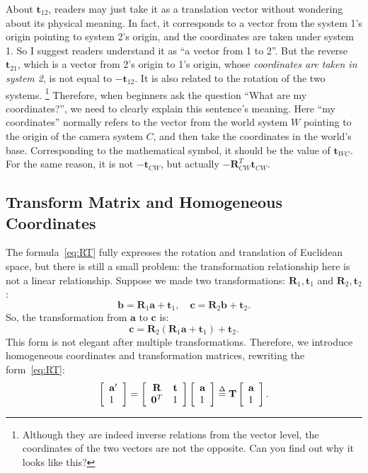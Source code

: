 About $\mathbf{t}_{12}$, readers may just take it as a translation vector without wondering about its physical meaning. In fact, it corresponds to a vector from the system 1's origin pointing to system 2's origin, and the coordinates are taken under system 1. So I suggest readers understand it as ``a vector from 1 to 2''. But the reverse $ \mathbf{t}_{21} $, which is a vector from 2's origin to 1's origin, whose \textit{coordinates are taken in system 2}, is not equal to $-\mathbf{t}_{12}$. It is also related to the rotation of the two systems. \footnote{Although they are indeed inverse relations from the vector level, the coordinates of the two vectors are not the opposite. Can you find out why it looks like this?} Therefore, when beginners ask the question ``What are my coordinates?'', we need to clearly explain this sentence's meaning. Here ``my coordinates'' normally refers to the vector from the world system $W$ pointing to the origin of the camera system $C$, and then take the coordinates in the world's base. Corresponding to the mathematical symbol, it should be the value of $ \mathbf{t}_{WC} $. For the same reason, it is not $ - \mathbf {t}_{CW}$, but actually $-\mathbf{R}_{CW}^T \mathbf{t}_{CW}$.

\subsection{Transform Matrix and Homogeneous Coordinates}
The formula~\eqref{eq:RT} fully expresses the rotation and translation of Euclidean space, but there is still a small problem: the transformation relationship here is not a linear relationship. Suppose we made two transformations: $ \mathbf {R}_ 1, \mathbf {t}_ 1 $ and $ \mathbf {R}_ 2, \mathbf {t}_ 2 $:
\[
\mathbf{b} = {\mathbf{R}_1} \mathbf{a} + {\mathbf{t}_1}, \quad \mathbf{c} = {\mathbf{R}_2} \mathbf{b} + {\mathbf{t}_2}.
\]
So, the transformation from $ \mathbf{a} $ to $ \mathbf{c} $ is:
\[
\mathbf{c} = {\mathbf{R}_2}\left( {{\mathbf{R}_1} \mathbf{a} + {\mathbf{t}_1}} \right) + {\mathbf{t}_2}.
\]
This form is not elegant after multiple transformations. Therefore, we introduce homogeneous coordinates and transformation matrices, rewriting the form~\eqref{eq:RT}:
\begin{equation}
\left[\begin{array}{l} 
\mathbf {a} ' \\
1
\end{array} \right] = 
\left[ {\begin{array}{*{20}{c}}
    \mathbf{R}&\mathbf{t}\\
    {{\mathbf{0}^T}}&1
    \end{array}} \right]
\left[ \begin{array}{l}
\mathbf {a} \\
1
\end{array} \right]  \buildrel \Delta \over = \mathbf{T} \left[ \begin{array}{l}
\mathbf {a} \\
1
\end{array} \right].
\end{equation}

